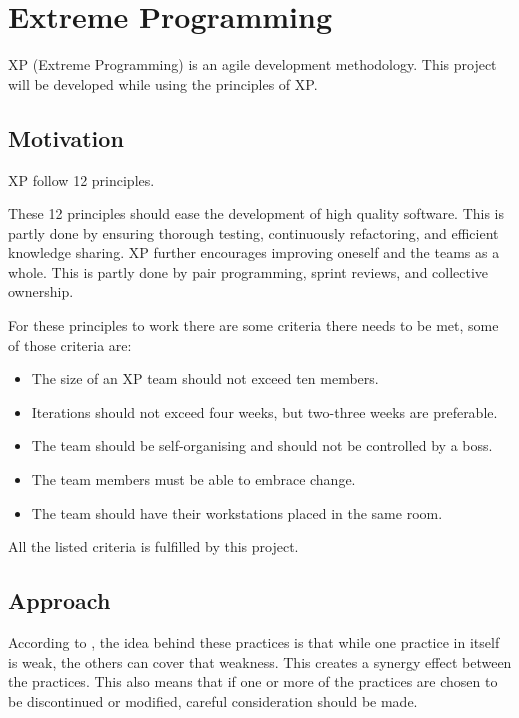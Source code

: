 \section{Extreme Programming}
XP (Extreme Programming) is an agile development methodology. This project will be developed while using the principles of XP.

\subsection{Motivation}
XP follow 12 principles.

These 12 principles should ease the development of high quality software.
This is partly done by ensuring thorough testing, continuously refactoring, and efficient knowledge sharing.
XP further encourages improving oneself and the teams as a whole.
This is partly done by pair programming, sprint reviews, and collective ownership.

For these principles to work there are some criteria there needs to be met, some of those criteria are:
\begin{itemize}
\item The size of an XP team should not exceed ten members.
\item Iterations should not exceed four weeks, but two-three weeks are preferable.
\item The team should be self-organising and should not be controlled by a boss.
\item The team members must be able to embrace change.
\item The team should have their workstations placed in the same room.
\end{itemize}

All the listed criteria is fulfilled by this project.

\subsection{Approach}
According to \citet[p. 53]{xp:explained}, the idea behind these practices is that while one practice in itself is weak, the others can cover that weakness. This creates a synergy effect between the practices. This also means that if one or more of the practices are chosen to be discontinued or modified, careful consideration should be made.

